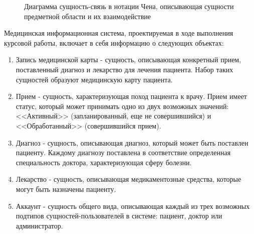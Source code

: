 \begin{figure}[!h]
	\caption{Диаграмма сущность-связь в нотации Чена, описывающая сущности предметной области и их взаимодействие}
\end{figure}

Медицинская информационная система, проектируемая в ходе выполнения курсовой работы, включает в себя информацию о следующих объектах:

\begin{enumerate}
	\item Запись медицинской карты - сущность, описывающая конкретный прием, поставленный диагноз и лекарство для лечения пациента. Набор таких сущностей образуют медицинскую карту пациента.
	\item Прием - сущность, характеризующая поход пациента к врачу. Прием имеет статус, который может принимать одно из двух возможных значений: <<Активный>> (запланированный, еще не совершившийся) и <<Обработанный>> (совершившийся прием).
	\item Диагноз - сущность, описывающая диагноз, который может быть поставлен пациенту. Каждому диагнозу поставлена в соответствие определенная специальность доктора, характеризующая сферу болезни.
	\item Лекарство - сущность, описывающая медикаментозные средства, которые могут быть назначены пациенту.
	\item Аккаунт - сущность общего вида, описывающая каждый из трех возможных подтипов сущностей-пользователей в системе: пациент, доктор или администратор.
\end{enumerate}

